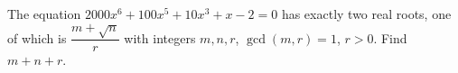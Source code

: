 The equation $2000x^6+100x^5+10x^3+x-2=0$ has exactly two real roots, one of which is $\dfrac{m+\sqrt n}r$ with integers $m,n,r$, $\gcd(m,r)=1$, $r>0$. Find $m+n+r$.
